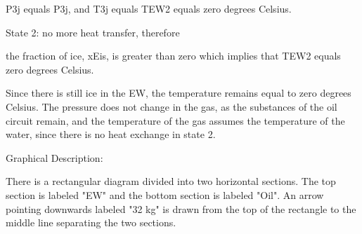 P3j equals P3j, and T3j equals TEW2 equals zero degrees Celsius.

State 2: no more heat transfer, therefore

the fraction of ice, xEis, is greater than zero which implies that TEW2 equals zero degrees Celsius.

Since there is still ice in the EW, the temperature remains equal to zero degrees Celsius. The pressure does not change in the gas, as the substances of the oil circuit remain, and the temperature of the gas assumes the temperature of the water, since there is no heat exchange in state 2.

Graphical Description:

There is a rectangular diagram divided into two horizontal sections. The top section is labeled "EW" and the bottom section is labeled "Oil". An arrow pointing downwards labeled "32 kg" is drawn from the top of the rectangle to the middle line separating the two sections.